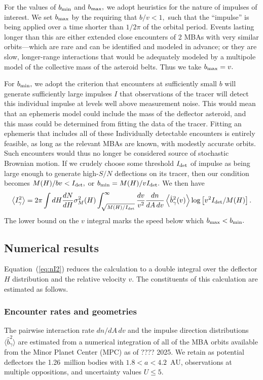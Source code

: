 \documentclass[linenumbers, onecolumn]{aastex631}
\newcommand{\eqq}[1]{Equation~(\ref{#1})}
\begin{document}
For the values of $b_{\rm min}$ and $b_{\rm max},$ we adopt heuristics
for the nature of impulses of interest.  We set $b_{\rm max}$ by the
requiring that $b/v<1,$ such that the ``impulse'' is being applied
over a time shorter than $1/2\pi$ of the orbital period.  Events
lasting longer than this are either extended close encounters of 2
MBAs with very similar orbits---which are rare and can be identified
and modeled in advance; or they are slow, longer-range interactions
that would be adequately modeled by a multipole model of the
collective mass of the asteroid belts.  Thus we take $b_{\rm max}=v.$

For $b_{\rm min},$ we adopt the criterion that encounters at
sufficiently small $b$ will generate sufficiently large impulses $I$
that observations of the tracer will detect this individual impulse at
levels well above measurement noise.  This would mean that an
ephemeris model could include the mass of the deflector asteroid, and
this mass could be determined from fitting the data of the tracer.
Fitting an ephemeris that includes all of these Individually
detectable encounters is entirely feasible, as long as the relevant
MBAs are known, with modestly accurate orbits.
Such encounters would thus no longer be considered source of
stochastic Brownian motion.  If we crudely choose some threshold
$I_{\rm det}$ of impulse as being large enough to generate high-$S/N$
deflections on its tracer, then our condition becomes $M(H)/bv <
I_{\rm det},$ or $b_{\rm min}=M(H)/vI_{\rm det}.$  We then have
\begin{equation}
   \left\langle I_\gamma^2 \right\rangle = 
2\pi \int dH \frac{dN}{dH} \sigma^2_M(H)  \int_{\sqrt{M(H)/I_{\rm
      det}}}^\infty \frac{dv}{v^2} 
        \frac{dn}{dA\,dv}  \left\langle\hat b_\gamma^2(v)\right\rangle
        \log \left[v^2 I_{\rm det}/M(H)\right].
        \label{eq:nI2}
      \end{equation}
The lower bound on the $v$ integral marks the speed below which
$b_{\rm max}<b_{\rm min}.$

\subsection{Numerical results}
\eqq{eq:nI2} reduces the calculation to a double integral over the
deflector $H$ distribution and the relative velocity $v.$  The
constituents of this calculation are estimated as follows.

\subsubsection{Encounter rates and geometries}
The pairwise interaction rate $dn/dA\,dv$ and the impulse direction
distributions $\langle \hat b^2_\gamma \rangle$ are estimated from a
numerical integration of all of the MBA orbits available
from the Minor Planet Center (MPC) as of ???? 2025.   We retain as
potential deflectors the 1.26~million bodies with $1.8<a<4.2$~AU,
observations at multiple oppositions, and uncertainty values $U\le5.$
\end{document}
